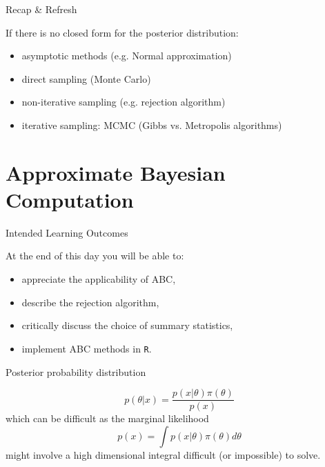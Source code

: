 
\begin{frame}{Recap \& Refresh}

	If there is no closed form for the posterior distribution:
        \begin{itemize}
                \item asymptotic methods (e.g. Normal approximation)
		\item direct sampling (Monte Carlo)
		\item non-iterative sampling (e.g. rejection algorithm)
		\item iterative sampling: MCMC (Gibbs vs. Metropolis algorithms)
        \end{itemize}

\end{frame}

\section{Approximate Bayesian Computation}

\begin{frame}{Intended Learning Outcomes}

        At the end of this day you will be able to:
        \begin{itemize}
                \item appreciate the applicability of ABC,
		\item describe the rejection algorithm,
		\item critically discuss the choice of summary statistics,
                \item implement ABC methods in \texttt{R}.
        \end{itemize}

\end{frame}

\begin{frame}{Posterior probability distribution}

	\begin{equation*}
        	p(\theta|x) = \frac{p(x|\theta)\pi(\theta)}{p(x)}
  	\end{equation*}
    	which can be difficult as the marginal likelihood
       	\begin{equation*}
		p(x) = \int p(x|\theta) \pi(\theta) d\theta
       	\end{equation*}
    	might involve a high dimensional integral difficult (or impossible) to solve.
               
\end{frame}

